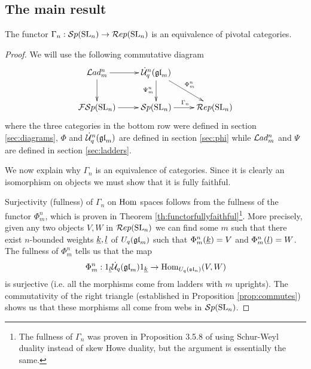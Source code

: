 \documentclass[11pt]{amsart}
\begin{document}
\subsection{The main result}\label{sec:main}

\begin{thm}\label{thm:main}
The functor $\Gamma_n: {\mathcal{S}p}({\rm{SL}}_n) \rightarrow \mathcal{R}ep({\rm{SL}}_n)$ is an equivalence of pivotal categories.
\end{thm}
\begin{proof}
We will use the following commutative diagram
\begin{equation}\label{diag:main}
\xymatrix{
\Lad_m^n \ar[r] \ar[d] & \dU^n(\gl_m) \ar[dr]^{\Phi_m^n} \ar[d]_{\Psi_m^n} & \\
\FSp(\SL_n) \ar[r] & \Sp(\SL_n) \ar[r]^{\Gamma_n} & \Rep(\SL_n) \\
}
\end{equation}
where the three categories in the bottom row were defined in section \ref{sec:diagrams}, $\Phi$ and $\dot{{\mathcal{U}}}_q^n({\mathfrak{gl}}_m)$ are defined in section \ref{sec:phi} while $\mathcal{L}ad_m^n$ and $\Psi$ are defined in section \ref{sec:ladders}.

We now explain why $\Gamma_n$ is an equivalence of categories. Since it is clearly an isomorphism on objects we must show that it is fully faithful.

Surjectivity (fullness) of $\Gamma_n$ on $\operatorname{Hom}$ spaces follows from the fullness of the functor $ \Phi^n_m $, which is proven in Theorem \ref{th:functorfullyfaithful}\footnote{The fullness of $\Gamma_n$ was proven in Proposition 3.5.8 of \cite{0704.1503} using Schur-Weyl duality instead of skew Howe duality, but the argument is essentially the same.}.  More precisely, given any two objects $ V, W $ in $\mathcal{R}ep({\rm{SL}}_n) $ we can find some $m$ such that there exist $ n$-bounded weights $ {\underline{k}}, {\underline{l}} $ of $ U_q({\mathfrak{gl}}_m)$ such that $\Phi^n_m({\underline{k}}) = V$ and $\Phi^n_m({\underline{l}}) = W $. The fullness of $ \Phi^n_m $ tells us that the map
$$ \Phi^n_m : 1_{{\underline{l}}} \dot{{\mathcal{U}}}_q({\mathfrak{gl}}_m) 1_{{\underline{k}}} \rightarrow \operatorname{Hom}_{U_q({\mathfrak{sl}}_n)}(V, W) $$
is surjective (i.e. all the morphisms come from ladders with $m$ uprights). The commutativity of the right triangle (established in Proposition \ref{prop:commutes}) shows us that these morphisms all come from webs in $ {\mathcal{S}p}({\rm{SL}}_n) $.


\end{proof}
\end{document}
